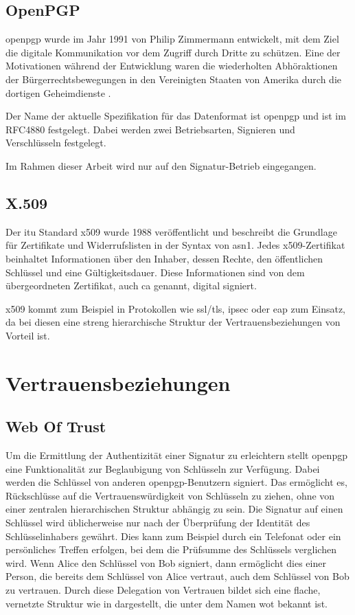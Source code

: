 \subsection{OpenPGP}
\label{sec:GrundlagenDefinitionen:DigitaleSignaturen:Verfahren:openpgp}
\gls{openpgp} wurde im Jahr 1991 von Philip Zimmermann \cite{zimmermann:pgp} entwickelt, mit dem Ziel die digitale Kommunikation vor dem Zugriff durch Dritte zu
schützen. Eine der Motivationen während der Entwicklung waren die wiederholten Abhöraktionen der Bürgerrechtsbewegungen in den Vereinigten Staaten von Amerika
durch die dortigen Geheimdienste \cite{singh:messages}.

Der Name der aktuelle Spezifikation für das Datenformat ist \gls{openpgp} und ist im RFC4880 \cite{openpgp:ietf} festgelegt. Dabei werden zwei Betriebsarten,
Signieren und Verschlüsseln festgelegt.

Im Rahmen dieser Arbeit wird nur auf den Signatur-Betrieb eingegangen.

\subsection{X.509}
\label{sec:GrundlagenDefinitionen:DigitaleSignaturen:Verfahren:x509}
Der \gls{itu} Standard \gls{x509} wurde 1988 veröffentlicht und beschreibt die Grundlage für Zertifikate und Widerrufslisten in der Syntax von \gls{asn1}.
Jedes \gls{x509}-Zertifikat beinhaltet Informationen über den Inhaber, dessen Rechte, den öffentlichen Schlüssel und eine Gültigkeitsdauer. Diese Informationen
sind von dem übergeordneten Zertifikat, auch \gls{ca} genannt, digital signiert.

\gls{x509} kommt zum Beispiel in Protokollen wie \gls{ssl}/\gls{tls}, \gls{ipsec} oder \gls{eap} zum Einsatz, da bei diesen eine streng hierarchische Struktur
der Vertrauensbeziehungen von Vorteil ist. \cite{kits} 

\section{Vertrauensbeziehungen}
\subsection{Web Of Trust}
Um die Ermittlung der Authentizität einer Signatur zu erleichtern stellt \gls{openpgp} eine Funktionalität zur Beglaubigung von Schlüsseln zur Verfügung. Dabei
werden die Schlüssel von anderen \gls{openpgp}-Benutzern signiert. Das ermöglicht es, Rückschlüsse auf die Vertrauenswürdigkeit von Schlüsseln zu ziehen, ohne
von einer zentralen hierarchischen Struktur abhängig zu sein. Die Signatur auf einen Schlüssel wird üblicherweise nur nach der Überprüfung der Identität des
Schlüsselinhabers gewährt. Dies kann zum Beispiel durch ein Telefonat oder ein persönliches Treffen erfolgen, bei dem die Prüfsumme des Schlüssels verglichen
wird.  
Wenn Alice den Schlüssel von Bob signiert, dann ermöglicht dies einer Person, die bereits dem Schlüssel von Alice vertraut, auch dem Schlüssel von Bob zu
vertrauen. Durch diese Delegation von Vertrauen bildet sich eine flache, vernetzte Struktur wie in  dargestellt, die unter dem Namen \gls{wot}
bekannt ist. 


